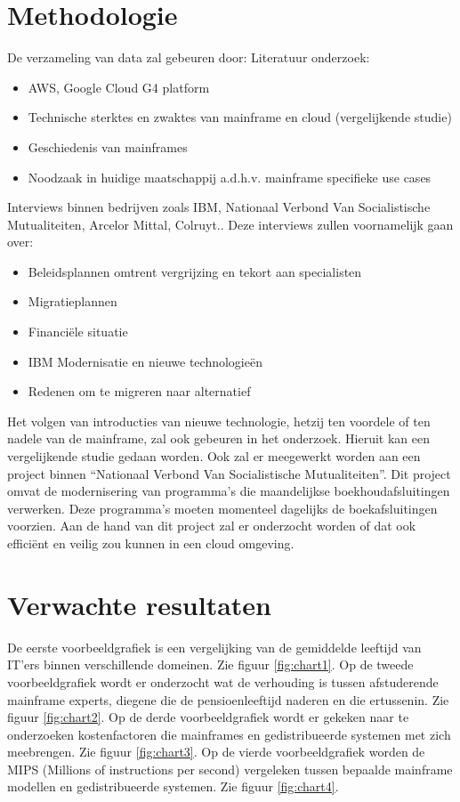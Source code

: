\section{Methodologie} 
\label{sec:methodologie}
De verzameling van data zal gebeuren door: \newline
Literatuur onderzoek:
\begin{itemize}
    \item AWS, Google Cloud G4 platform 
    \item Technische sterktes en zwaktes van mainframe en cloud (vergelijkende studie)
    \item Geschiedenis van mainframes
    \item Noodzaak in huidige maatschappij a.d.h.v. mainframe specifieke use cases
\end{itemize}
Interviews binnen bedrijven zoals IBM, Nationaal Verbond Van Socialistische Mutualiteiten, Arcelor Mittal, Colruyt.. Deze interviews zullen voornamelijk gaan over:
\begin{itemize}
     \item Beleidsplannen omtrent vergrijzing en tekort aan specialisten
     \item Migratieplannen
     \item Financiële situatie
     \item IBM Modernisatie en nieuwe technologieën 
     \item Redenen om te migreren naar alternatief
\end{itemize}
Het volgen van introducties van nieuwe technologie, hetzij ten voordele of ten nadele van de mainframe, zal ook gebeuren in het onderzoek. Hieruit kan een vergelijkende studie gedaan worden. Ook zal er meegewerkt worden aan een project binnen “Nationaal Verbond Van Socialistische Mutualiteiten”. Dit project omvat de modernisering van programma’s die maandelijkse boekhoudafsluitingen verwerken. Deze programma’s moeten momenteel dagelijks de boekafsluitingen voorzien. Aan de hand van dit project zal er onderzocht worden of dat ook efficiënt en veilig zou kunnen in een cloud omgeving. \newpage
\section{Verwachte resultaten}
\label{sec:verwachte_resultaten}
De eerste voorbeeldgrafiek is een vergelijking van de gemiddelde leeftijd van IT'ers binnen verschillende domeinen. Zie figuur \ref{fig:chart1}. \newline
Op de tweede voorbeeldgrafiek wordt er onderzocht wat de verhouding is tussen afstuderende mainframe experts, diegene die de pensioenleeftijd naderen en die ertussenin. Zie figuur \ref{fig:chart2}. \newline
Op de derde voorbeeldgrafiek wordt er gekeken naar te onderzoeken kostenfactoren die mainframes en gedistribueerde systemen met zich meebrengen. Zie figuur \ref{fig:chart3}. \newline
Op de vierde voorbeeldgrafiek worden de MIPS (Millions of instructions per second) vergeleken tussen bepaalde mainframe modellen en gedistribueerde systemen. Zie figuur \ref{fig:chart4}. \newline


